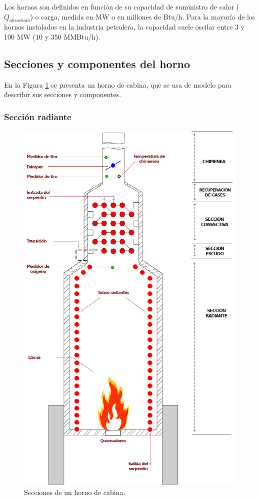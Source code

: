 \par Los hornos son definidos en función de su capacidad de suministro de calor ($Q_{absorbido}$) o carga, medida en MW o en millones de Btu/h. Para la mayoría de los hornos instalados en la industria petrolera, la capacidad suele oscilar entre 3 y 100 MW (10 y 350 MMBtu/h)\cite{bib:sandoval}.

\subsection{Secciones y componentes del horno}
\par En la Figura \ref{fig:horno} se presenta un horno de cabina, que se usa de modelo para describir sus secciones y componentes.

\subsubsection{Sección radiante}
\begin{figure} \begin{center}
\includegraphics[scale=0.38]{images/horno}
\caption[Secciones de un horno]{Secciones de un horno de cabina.\cite{bib:thermox}}
\label{fig:horno} \end{center} \end{figure}
